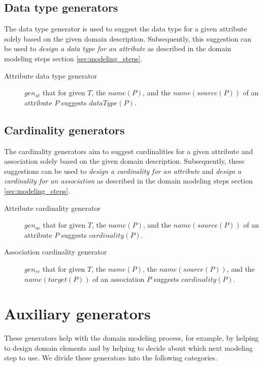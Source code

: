 \subsection{Data type generators}

The data type generator is used to suggest the data type for a given attribute solely based on the given domain description. Subsequently, this suggestion can be used to \emph{design a data type for an attribute} as described in the domain modeling steps section \ref{sec:modeling_steps}.

\begin{description}
\item [Attribute data type generator] $gen_{at}$ that for given $T$, the $name(P)$, and the $name(source(P))$ of an attribute $P$ suggests $dataType(P)$.
\end{description}


\subsection{Cardinality generators}

The cardinality generators aim to suggest cardinalities for a given attribute and association solely based on the given domain description. Subsequently, these suggestions can be used to \emph{design a cardinality for an attribute} and \emph{design a cardinality for an association} as described in the domain modeling steps section \ref{sec:modeling_steps}.

\begin{description}
\item [Attribute cardinality generator] $gen_{ac}$ that for given $T$, the $name(P)$, and the $name(source(P))$ of an attribute $P$ suggests $cardinality(P)$.

\item [Association cardinality generator] $gen_{rc}$ that for given $T$, the $name(P)$, the $name(source(P))$, and the $name(target(P))$ of an association $P$ suggests $cardinality(P)$.
\end{description}


\section{Auxiliary generators}

These generators help with the domain modeling process, for example, by helping to design domain elements and by helping to decide about which next modeling step to use. We divide these generators into the following categories.


